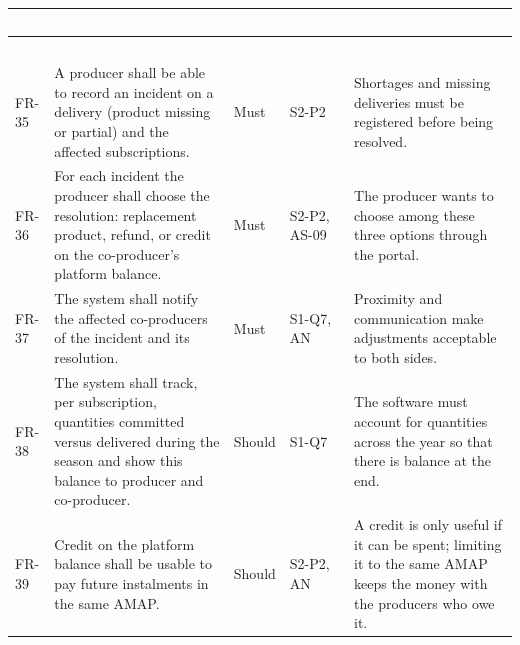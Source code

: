 \documentclass[11pt,a4paper]{article}
\begin{document}
{\footnotesize
\begin{longtable}{>{\raggedright\arraybackslash\hspace{0pt}}p{}>{\raggedright\arraybackslash\hspace{0pt}}p{}>{\raggedright\arraybackslash\hspace{0pt}}p{}>{\raggedright\arraybackslash\hspace{0pt}}p{}>{\raggedright\arraybackslash\hspace{0pt}}p{}}
\rowcolor{hdr}\textcolor{white}{\textbf{ID}} & \textcolor{white}{\textbf{Requirement}} & \textcolor{white}{\textbf{Prio.}} & \textcolor{white}{\textbf{Source}} & \textcolor{white}{\textbf{Justification}} \\ \endfirsthead
\rowcolor{hdr}\textcolor{white}{\textbf{ID}} & \textcolor{white}{\textbf{Requirement}} & \textcolor{white}{\textbf{Prio.}} & \textcolor{white}{\textbf{Source}} & \textcolor{white}{\textbf{Justification}} \\ \endhead
FR-35 & A producer shall be able to record an incident on a delivery (product missing or partial) and the affected subscriptions. & Must & S2-P2 & Shortages and missing deliveries must be registered before being resolved. \\ \hline
FR-36 & For each incident the producer shall choose the resolution: replacement product, refund, or credit on the co-producer's platform balance. & Must & S2-P2, AS-09 & The producer wants to choose among these three options through the portal. \\ \hline
FR-37 & The system shall notify the affected co-producers of the incident and its resolution. & Must & S1-Q7, AN & Proximity and communication make adjustments acceptable to both sides. \\ \hline
FR-38 & The system shall track, per subscription, quantities committed versus delivered during the season and show this balance to producer and co-producer. & Should & S1-Q7 & The software must account for quantities across the year so that there is balance at the end. \\ \hline
FR-39 & Credit on the platform balance shall be usable to pay future instalments in the same AMAP. & Should & S2-P2, AN & A credit is only useful if it can be spent; limiting it to the same AMAP keeps the money with the producers who owe it. \\ \hline
\end{longtable}}
\addtocounter{table}{-1}
\end{document}
